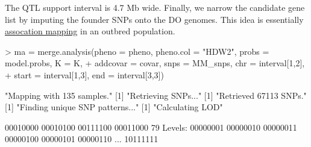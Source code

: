 \documentclass{article}
\begin{document}
The QTL support interval is 4.7 Mb wide.
\vspace{5 mm}
Finally, we narrow the candidate gene list by imputing the founder SNPs onto the DO genomes. This idea is essentially \href{http://www.ncbi.nlm.nih.gov/pubmed/22847376}{assocation mapping} in an outbred population.

\begin{Schunk}
\begin{Sinput}
> ma = merge.analysis(pheno = pheno, pheno.col = "HDW2", probs = model.probs, K = K,
+                     addcovar = covar, snps = MM_snps, chr = interval[1,2], 
+                     start = interval[1,3], end = interval[3,3])
\end{Sinput}
\begin{Soutput}
[1] "Mapping with 135 samples."
[1] "Retrieving SNPs..."
[1] "Retrieved 67113 SNPs."
[1] "Finding unique SNP patterns..."
[1] "Calculating LOD"
\end{Soutput}
\begin{Soutput}
[1] 00010000 00010100 00111100 00011000
79 Levels: 00000001 00000010 00000011 00000100 00000101 00000110 ... 10111111
\end{Soutput}
\end{Schunk}
\end{document}
